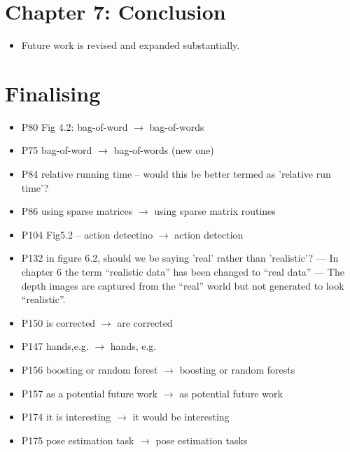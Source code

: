 \documentclass[10pt, a4paper]{article}
\begin{document}
\section{Chapter 7: Conclusion}
\begin{itemize}
\item Future work is revised and expanded substantially. 
\end{itemize}

\section{Finalising}
\begin{itemize}
	\item P80	Fig 4.2:  bag-of-word $\rightarrow$ bag-of-words
	\item P75	bag-of-word $\rightarrow$ bag-of-words (new one)
	\item P84	relative running time -- would this be better termed as 'relative run time'?
	\item P86	using sparse matrices $\rightarrow$ using sparse matrix routines  
	\item P104 	Fig5.2 -- action detectino $\rightarrow$ action detection
	\item P132 	in figure 6.2, should we be saying 'real' rather than 'realistic'? --- In chapter 6 the term ``realistic data'' has been changed to ``real data'' --- The depth images are captured from the ``real'' world but not generated to look ``realistic''.
	\item P150	is corrected $\rightarrow$ are corrected
	\item P147 	hands,e.g. $\rightarrow$ hands, e.g.
	\item P156 	boosting or random forest $\rightarrow$ boosting or random forests
	\item P157 	as a potential future work $\rightarrow$ as potential future work
	\item P174	it is interesting $\rightarrow$ it would be interesting
	\item P175	pose estimation task $\rightarrow$ pose estimation tasks
\end{itemize}


 
\end{document}

